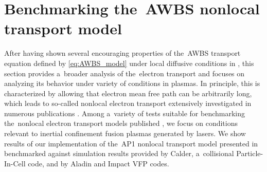 \section{Benchmarking the~AWBS nonlocal transport model}
\label{sec:BenchmarkingAWBS}
After having shown several encouraging properties of the~AWBS transport 
equation defined by \eqref{eq:AWBS_model} under local diffusive conditions
in , this section provides a~broader analysis
of the~electron transport and focuses on analyzing its behavior under variety of
conditions in plasmas. In principle, this is characterized by allowing that
electron mean free path can be arbitrarily long, which leads to so-called 
nonlocal electron transport extensively investigated in numerous publications 
\cite{Malone_1975_15, Colombant_PoP2005, Bell_1981_83, LMV_1983_7, Brantov_Nonlocal_electron_transport_1998, schurtz2000, Sorbo_2015}.
Among a~variety of tests suitable for benchmarking the~nonlocal electron 
transport models published 
\cite{Epperlein_PoFB1991, marocchino2013, Sorbo_2015, 
Sorbo_2016, Sherlock_PoP2017, Brodrick_PoP2017}, we focus on 
conditions relevant to inertial confinement fusion plasmas generated by lasers.
We show results of our implementation of the~AP1 nonlocal transport model 
presented in  benchmarked against simulation results
provided by Calder, a~collisional Particle-In-Cell
code, and by Aladin and Impact \cite{Kingham_JCP2004} VFP codes. 



